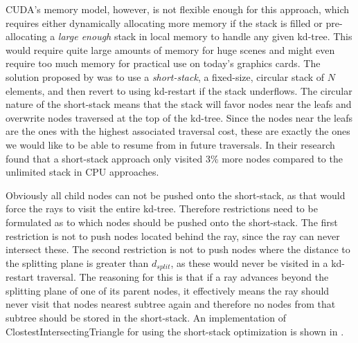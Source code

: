 CUDA's memory model, however, is not flexible enough for this approach, which
requires either dynamically allocating more memory if the stack is filled or
pre-allocating a \textit{large enough} stack in local memory to handle any given
kd-tree. This would require quite large amounts of memory for huge scenes and
might even require too much memory for practical use on today's graphics
cards. The solution proposed by \horn{} was to use a \textit{short-stack}, a
fixed-size, circular stack of $N$ elements, and then revert to using kd-restart
if the stack underflows. The circular nature of the short-stack means that the
stack will favor nodes near the leafs and overwrite nodes traversed at the top
of the kd-tree. Since the nodes near the leafs are the ones with the highest
associated traversal cost, these are exactly the ones we would like to be able
to resume from in future traversals. In their research \horn{} found that a
short-stack approach only visited 3\% more nodes compared to the unlimited stack
in CPU approaches.


Obviously all child nodes can not be pushed onto the short-stack, as that would
force the rays to visit the entire kd-tree. Therefore restrictions need to be
formulated as to which nodes should be pushed onto the short-stack. The first
restriction is not to push nodes located behind the ray, since the ray can never
intersect these. The second restriction is not to push nodes where the distance
to the splitting plane is greater than $d_{split}$, as these would never be
visited in a kd-restart traversal. The reasoning for this is that if a ray
advances beyond the splitting plane of one of its parent nodes, it effectively
means the ray should never visit that nodes nearest subtree again and therefore
no nodes from that subtree should be stored in the short-stack. An
implementation of ClostestIntersectingTriangle for 
using the short-stack optimization is shown in .

